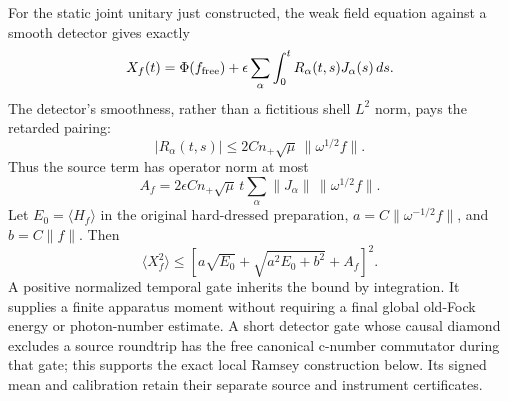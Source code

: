 For the static joint unitary just constructed, the weak field equation
against a smooth detector gives exactly
\[
 X_f(t)=\Phi(f_{\rm free})+
          \epsilon\sum_\alpha\int_0^tR_\alpha(t,s)J_\alpha(s)\,ds.
\]
The detector's smoothness, rather than a fictitious shell $L^2$ norm,
pays the retarded pairing:
\[
 |R_\alpha(t,s)|
 \le2C n_+\sqrt\mu\,\|\omega^{1/2}f\|.
\]
Thus the source term has operator norm at most
\[
 A_f=2\epsilon C n_+\sqrt\mu\,t
                  \sum_\alpha\|J_\alpha\|\,\|\omega^{1/2}f\|.
\]
Let $E_0=\langle H_f\rangle$ in the original hard-dressed preparation,
$a=C\|\omega^{-1/2}f\|$, and $b=C\|f\|$. Then
\[
 \langle X_f^2\rangle
 \le\left[a\sqrt{E_0}+\sqrt{a^2E_0+b^2}+A_f\right]^2.
\]
A positive normalized temporal gate inherits the bound by integration.
It supplies a finite apparatus moment without requiring a final global
old-Fock energy or photon-number estimate. A short detector gate whose
causal diamond excludes a source roundtrip has the free canonical
c-number commutator during that gate; this supports the exact local
Ramsey construction below. Its signed mean and calibration retain their
separate source and instrument certificates.

